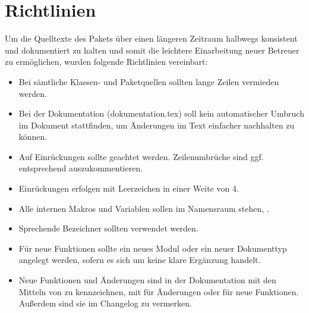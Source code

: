 \section{Richtlinien}
    Um die Quelltexte des Pakets über einen längeren Zeitraum halbwegs konsistent und dokumentiert zu halten und somit die leichtere  Einarbeitung neuer Betreuer zu ermöglichen, wurden folgende Richtlinien vereinbart:
    \begin{itemize}
        \item Bei sämtliche Klassen- und Paketquellen sollten lange Zeilen vermieden werden.
        \item Bei der Dokumentation (dokumentation.tex) soll kein automatischer Umbruch im Dokument stattfinden, um Änderungen im Text einfacher nachhalten zu können.
        \item Auf Einrückungen sollte geachtet werden. Zeilenumbrüche  sind ggf. entsprechend auszukommentieren.
        \item Einrückungen erfolgen mit Leerzeichen in einer Weite von 4.
        \item Alle internen Makros und Variablen sollen im Namensraum   stehen, \zB\space{}.
        \item Sprechende Bezeichner sollten verwendet werden.
        \item Für neue Funktionen sollte ein neues Modul oder ein neuer Dokumenttyp angelegt werden, sofern es sich um keine klare Ergänzung handelt.
        \item Neue Funktionen und Änderungen sind in der Dokumentation mit den Mitteln von  zu kennzeichnen, \zB\space mit  für Änderungen oder  für neue Funktionen. Außerdem sind sie im Changelog zu vermerken.
    \end{itemize}